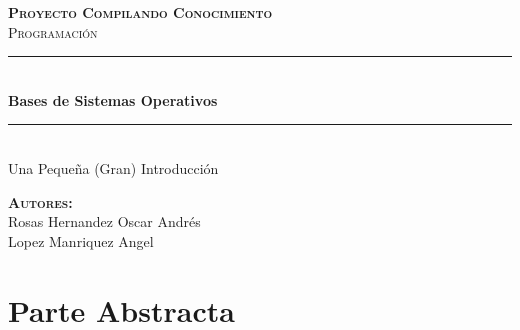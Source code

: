 \documentclass[12pt, fleqn]{report}                             %
\author{Oscar Andrés Rosas}                                     %
\begin{document}
\begin{titlepage}

	\center
	\textbf{\textsc{\Large Proyecto Compilando Conocimiento}}\\[1.0cm] 
	\textsc{\Large Programación}\\[1.0cm] 

	\rule{\linewidth}{0.5mm} \\[1.0cm]
		{ \huge \bfseries Bases de Sistemas Operativos}\\[1.0cm] 
	\rule{\linewidth}{0.5mm} \\[2.0cm]
	
	{\LARGE Una Pequeña (Gran) Introducción}\\[7cm] 
	
	\begin{center} \large
    \textbf{\textsc{Autores:}}\\
        Rosas Hernandez Oscar Andrés \\
        Lopez Manriquez Angel
    \end{center}

	\vfill

\end{titlepage}

\tableofcontents{}
\label{sec:Index}

\clearpage




\part{Parte Abstracta}
\clearpage


\end{document}
